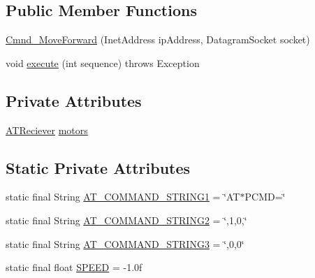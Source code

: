 \subsection*{Public Member Functions}
\begin{DoxyCompactItemize}
\item 
\hyperlink{class_drone_1_1_drone_commands_1_1_cmnd___move_forward_aa3f8ac2f30bfad3d919298c582200570}{Cmnd\+\_\+\+Move\+Forward} (Inet\+Address ip\+Address, Datagram\+Socket socket)
\item 
void \hyperlink{class_drone_1_1_drone_commands_1_1_cmnd___move_forward_a7acdc81da70c5f42ff156b8bedec3a7b}{execute} (int sequence)  throws Exception  	
\end{DoxyCompactItemize}
\subsection*{Private Attributes}
\begin{DoxyCompactItemize}
\item 
\hyperlink{class_drone_1_1_hardware_1_1_a_t_reciever}{A\+T\+Reciever} \hyperlink{class_drone_1_1_drone_commands_1_1_cmnd___move_forward_aec6387076f3e78a7295606c2473da639}{motors}
\end{DoxyCompactItemize}
\subsection*{Static Private Attributes}
\begin{DoxyCompactItemize}
\item 
static final String \hyperlink{class_drone_1_1_drone_commands_1_1_cmnd___move_forward_a3853e1dce92c48d53da296dbf40a7985}{A\+T\+\_\+\+C\+O\+M\+M\+A\+N\+D\+\_\+\+S\+T\+R\+I\+N\+G1} = \char`\"{}A\+T$\ast$P\+C\+M\+D=\char`\"{}
\item 
static final String \hyperlink{class_drone_1_1_drone_commands_1_1_cmnd___move_forward_a240220ee21e1d03dc805aeff576ef791}{A\+T\+\_\+\+C\+O\+M\+M\+A\+N\+D\+\_\+\+S\+T\+R\+I\+N\+G2} = \char`\"{},1,0,\char`\"{}
\item 
static final String \hyperlink{class_drone_1_1_drone_commands_1_1_cmnd___move_forward_ac1b3627bfc7ebce7bc609ba28082efae}{A\+T\+\_\+\+C\+O\+M\+M\+A\+N\+D\+\_\+\+S\+T\+R\+I\+N\+G3} = \char`\"{},0,0\char`\"{}
\item 
static final float \hyperlink{class_drone_1_1_drone_commands_1_1_cmnd___move_forward_a7d52a7ebe976f4f06332f4c98469f6e0}{S\+P\+E\+E\+D} = -\/1.\+0f
\end{DoxyCompactItemize}



